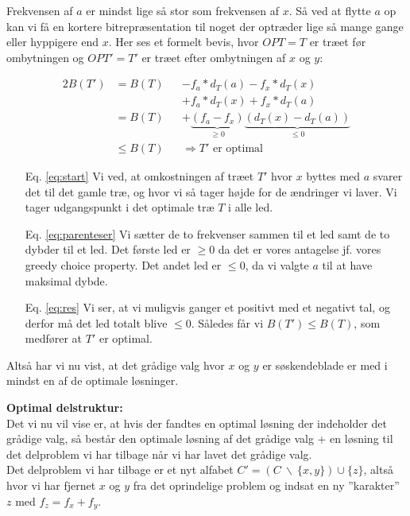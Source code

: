 Frekvensen af $a$ er mindst lige så stor som frekvensen af $x$. Så ved at flytte $a$ op kan vi få en kortere bitrepræsentation til noget der optræder lige så mange gange eller hyppigere end $x$. Her ses et formelt bevis, hvor $OPT = T$ er træet før ombytningen og $OPT' = T'$ er træet efter ombytningen af $x$ og $y$:

\begin{alignat}{2}
B(T') &= B(T) &&- f_a * d_{T}(a) - f_x * d_{T}(x) \nonumber \\
      &       &&+ f_a * d_{T}(x) + f_x * d_{T}(a) \label{eq:start} \\
      &= B(T) &&+ \underbrace{(f_a - f_x)}_{\geq 0} \underbrace{(d_T(x) - d_T(a))}_{\leq 0} \label{eq:parenteser} \\
      &\leq B(T) && \Longrightarrow \text{$T'$ er optimal}  \label{eq:res}
\end{alignat}

\begin{enumerate}
	\item[Eq. \cref{eq:start}] Vi ved, at omkostningen af træet $T'$ hvor $x$ byttes med $a$ svarer det til det gamle træ, og hvor vi så tager højde for de ændringer vi laver. Vi tager udgangspunkt i det optimale træ $T$ i alle led.
	\item[Eq. \cref{eq:parenteser}] Vi sætter de to frekvenser sammen til et led samt de to dybder til et led. Det første led er $\geq 0$ da det er vores antagelse jf. vores greedy choice property. Det andet led er $\leq 0$, da vi valgte $a$ til at have maksimal dybde.
	\item[Eq. \cref{eq:res}] Vi ser, at vi muligvis ganger et positivt med et negativt tal, og derfor må det led totalt blive $\leq 0$. Således får vi $B(T') \leq B(T)$, som medfører at $T'$ er optimal.
\end{enumerate}

Altså har vi nu vist, at det grådige valg hvor $x$ og $y$ er søskendeblade er med i mindst en af de optimale løsninger.






\newpage
\textbf{Optimal delstruktur:}\\
Det vi nu vil vise er, at hvis der fandtes en optimal løsning der indeholder det grådige valg, så består den optimale løsning af det grådige valg + en løsning til det delproblem vi har tilbage når vi har lavet det grådige valg.\\

Det delproblem vi har tilbage er et nyt alfabet $C' = (C \ \backslash \ \{x, y\}) \cup \{z\}$, altså hvor vi har fjernet $x$ og $y$ fra det oprindelige problem og indsat en ny ''karakter'' $z$ med $f_z = f_x + f_y$.\\

